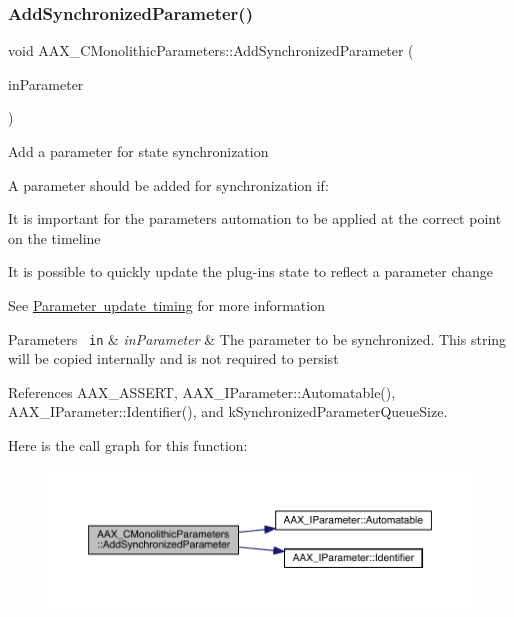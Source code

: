 \subsubsection{\texorpdfstring{AddSynchronizedParameter()}{AddSynchronizedParameter()}}
{\footnotesize\ttfamily void A\+A\+X\+\_\+\+C\+Monolithic\+Parameters\+::\+Add\+Synchronized\+Parameter (\begin{DoxyParamCaption}\item[{const \mbox{\hyperlink{a01857}{A\+A\+X\+\_\+\+I\+Parameter}} \&}]{in\+Parameter }\end{DoxyParamCaption})\hspace{0.3cm}{\ttfamily [protected]}}

Add a parameter for state synchronization

A parameter should be added for synchronization if\+:
\begin{DoxyItemize}
\item It is important for the parameter\textquotesingle{}s automation to be applied at the correct point on the timeline
\item It is possible to quickly update the plug-\/in\textquotesingle{}s state to reflect a parameter change
\end{DoxyItemize}

See \mbox{\hyperlink{a00821}{Parameter update timing}} for more information


\begin{DoxyParams}[1]{Parameters}
\mbox{\texttt{ in}}  & {\em in\+Parameter} & The parameter to be synchronized. This string will be copied internally and is not required to persist \\
\hline
\end{DoxyParams}


References A\+A\+X\+\_\+\+A\+S\+S\+E\+RT, A\+A\+X\+\_\+\+I\+Parameter\+::\+Automatable(), A\+A\+X\+\_\+\+I\+Parameter\+::\+Identifier(), and k\+Synchronized\+Parameter\+Queue\+Size.

Here is the call graph for this function\+:
\nopagebreak
\begin{figure}[H]
\begin{center}
\leavevmode
\includegraphics[width=350pt]{a01969_a1b23573e8aa3f8e64c61813b721559c2_cgraph}
\end{center}
\end{figure}
\mbox{\label{a01969_a9ef4fd6fa467008fcea4455d19c08009}} 
